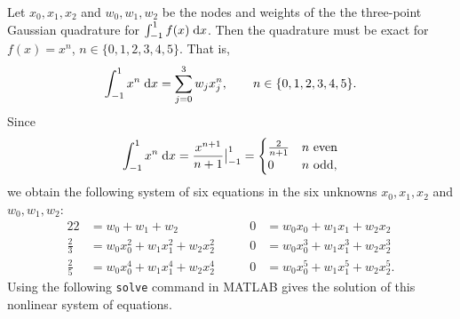 \documentclass{homework}
\begin{document}
	\maketitle
	
	\question
	Let $x_0, x_1, x_2$ and $w_0, w_1, w_2$ be the nodes and weights of the the three-point Gaussian quadrature for $\int_{-1}^1 f(x)\;\text{d} x$. Then the quadrature must be exact for $f(x)= x^n$, $n\in\{0,1,2,3,4,5\}$. That is,
	\begin{equation}
		\int_{-1}^1 x^n \;\text{d} x = \sum_{j=0}^3 w_j x_j^n, \qquad n\in\{0,1,2,3,4,5\}.
	\end{equation}
	Since
	\begin{equation}
		\int_{-1}^1 x^n \;\text{d} x = \frac{x^{n+1}}{n+1}\big\vert_{-1}^1 = \begin{cases}
			\frac{2}{n+1} & n \text{ even} \\
			0 & n \text{ odd},
		\end{cases}
	\end{equation}
	we obtain the following system of six equations in the six unknowns $x_0, x_1, x_2$ and $w_0, w_1, w_2$:
	\begin{alignat*}{2}
		2 &= w_0 + w_1 + w_2 &\qquad 0 & = w_0x_0 + w_1x_1 + w_2x_2 \\[0.3em]
		\frac{2}{3} &= w_0x_0^2 + w_1x_1^2 + w_2x_2^2 &\qquad 0 & = w_0x_0^3 + w_1x_1^3 + w_2x_2^3 \\[0.3em]
		\frac{2}{5} &= w_0x_0^4 + w_1x_1^4 + w_2x_2^4 &\qquad 0 & = w_0x_0^5 + w_1x_1^5 + w_2x_2^5.
	\end{alignat*}
	Using the following \verb*|solve| command in MATLAB gives the solution of this nonlinear system of equations.
	\begin{lstlisting}[language=MATLAB, numbers=left, frame=single, basicstyle=\small\ttfamily, showstringspaces=false]

	\end{lstlisting}
\end{document}
